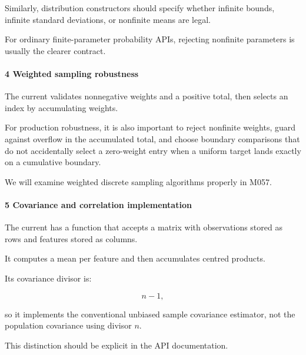 Similarly, distribution constructors should specify whether infinite bounds, infinite standard deviations, or nonfinite means are legal.

For ordinary finite-parameter probability APIs, rejecting nonfinite parameters is usually the clearer contract.

\paragraph{4 Weighted sampling robustness}\label{02-foundations-ii-ch039-weighted-sampling-robustness}

\hypertarget{02-foundations-ii-ch039-weighted-sampling-robustness}{}

The current  validates nonnegative weights and a positive total, then selects an index by accumulating weights.

For production robustness, it is also important to reject nonfinite weights, guard against overflow in the accumulated total, and choose boundary comparisons that do not accidentally select a zero-weight entry when a uniform target lands exactly on a cumulative boundary.

We will examine weighted discrete sampling algorithms properly in M057.

\paragraph{5 Covariance and correlation implementation}\label{02-foundations-ii-ch039-covariance-and-correlation-implementation}

\hypertarget{02-foundations-ii-ch039-covariance-and-correlation-implementation}{}

The current  has a  function that accepts a matrix with observations stored as rows and features stored as columns.

It computes a mean per feature and then accumulates centred products.

Its covariance divisor is:

\[
 n-1,
\]

so it implements the conventional unbiased sample covariance estimator, not the population covariance using divisor \(n\).

This distinction should be explicit in the API documentation.

